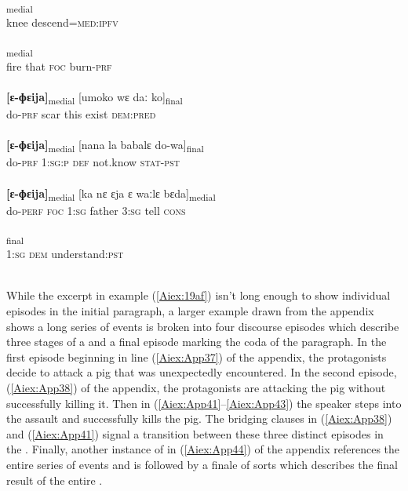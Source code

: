 \documentclass[output=paper]{LSP/langsci}
\begin{document}
	\begin{exe}
\ex \label{Aiex:19af}
\begin{xlist}
\ex \label{Aiex:19a}
\gll [gulu	tila=nɛgɛː]\textsubscript{medial}\\
knee	descend\textsc{=med:ipfv}\\
\glt {}\\
\ex \label{Aiex:19b}
\textsubscript{medial}\\
fire	that	\textsc{foc}	burn\textsc{-prf}\\
\glt {}\\
\ex \label{Aiex:19c}
\gll \textbf{[ɛ-ɸɛija]}\textsubscript{medial}	[umoko	wɛ	daː	ko]\textsubscript{final}\\
do\textsc{-prf}	scar	this	exist	\textsc{dem:pred}\\
\glt {}\\
\ex \label{Aiex:19d}
\gll \textbf{[ɛ-ɸɛija]}\textsubscript{medial}	[nana	la	babalɛ	do-wa]\textsubscript{final}\\
do\textsc{-prf}	\textsc{1:sg:p}	\textsc{def}	not.know	\textsc{stat-pst}\\
\glt {}\\
\ex \label{Aiex:19e}
\gll \textbf{[ɛ-ɸɛija]}\textsubscript{medial}	[ka	nɛ	ɛja	ɛ	waːlɛ	bɛda]\textsubscript{medial}\\
do-\textsc{perf}	\textsc{foc}	\textsc{1:sg}	father	\textsc{3:sg}	tell	\textsc{cons}\\
\glt {}\\
\ex \label{Aiex:19f}
\textsubscript{final}\\
\textsc{1:sg}	\textsc{dem}	understand\textsc{:pst}\\
\glt {}\\
\end{xlist}
\end{exe}

	While the excerpt in example (\ref{Aiex:19af}) isn’t long enough to show individual episodes in the initial paragraph, a larger example drawn from the appendix shows a long series of events is broken into four discourse episodes which describe three stages of a  and a final episode marking the coda of the paragraph. In the first episode beginning in line (\ref{Aiex:App37}) of the appendix, the protagonists decide to attack a pig that was unexpectedly encountered. In the second episode, (\ref{Aiex:App38}) of the appendix, the protagonists are attacking the pig without successfully killing it. Then in (\ref{Aiex:App41}--\ref{Aiex:App43}) the speaker steps into the assault and successfully kills the pig. The bridging clauses in (\ref{Aiex:App38}) and (\ref{Aiex:App41}) signal a transition between these three distinct episodes in the . Finally, another instance of  in (\ref{Aiex:App44}) of the appendix references the entire series of events and is followed by a finale of sorts which describes the final result of the entire .
	
\end{document}
